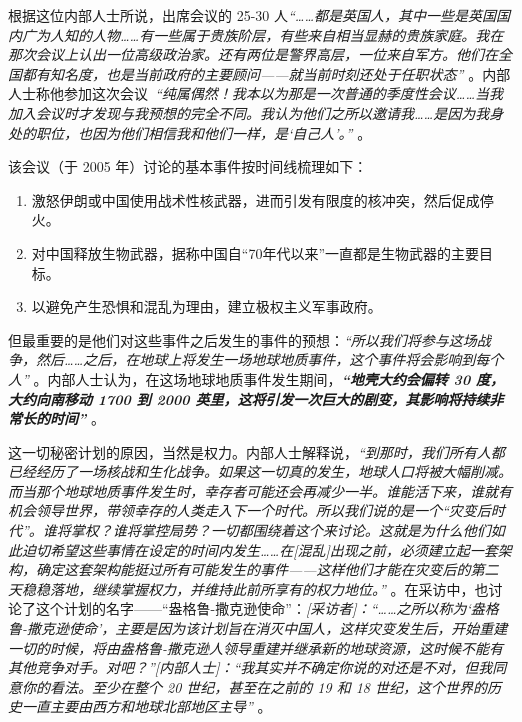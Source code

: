 \documentclass[10pt,twocolumn,letterpaper]{article}
\begin{document}
根据这位内部人士所说，出席会议的 25-30 人\textit{“……都是英国人，其中一些是英国国内广为人知的人物……有一些属于贵族阶层，有些来自相当显赫的贵族家庭。我在那次会议上认出一位高级政治家。还有两位是警界高层，一位来自军方。他们在全国都有知名度，也是当前政府的主要顾问——就当前时刻还处于任职状态”} \cite{4}。内部人士称他参加这次会议\ \textit{“纯属偶然！我本以为那是一次普通的季度性会议……当我加入会议时才发现与我预想的完全不同。我认为他们之所以邀请我……是因为我身处的职位，也因为他们相信我和他们一样，是‘自己人’。”} \cite{4}。

该会议（于 2005 年）讨论的基本事件按时间线梳理如下：

\begin{flushleft}
\begin{enumerate}
    \item 激怒伊朗或中国使用战术性核武器，进而引发有限度的核冲突，然后促成停火。
    \item 对中国释放生物武器，据称中国自“70年代以来”一直都是生物武器的主要目标。
    \item 以避免产生恐惧和混乱为理由，建立极权主义军事政府。
\end{enumerate}
\end{flushleft}

但最重要的是他们对这些事件之后发生的事件的预想：\textit{“所以我们将参与这场战争，然后……之后，在地球上将发生一场地球地质事件，这个事件将会影响到每个人”} \cite{4}。内部人士认为，在这场地球地质事件发生期间，\textit{\textbf{“地壳大约会偏转 30 度，大约向南移动 1700 到 2000 英里，这将引发一次巨大的剧变，其影响将持续非常长的时间”}} \cite{4}。

这一切秘密计划的原因，当然是权力。内部人士解释说，\textit{“到那时，我们所有人都已经经历了一场核战和生化战争。如果这一切真的发生，地球人口将被大幅削减。而当那个地球地质事件发生时，幸存者可能还会再减少一半。谁能活下来，谁就有机会领导世界，带领幸存的人类走入下一个时代。所以我们说的是一个“灾变后时代”。谁将掌权？谁将掌控局势？一切都围绕着这个来讨论。这就是为什么他们如此迫切希望这些事情在设定的时间内发生……在[混乱]出现之前，必须建立起一套架构，确定这套架构能挺过所有可能发生的事件——这样他们才能在灾变后的第二天稳稳落地，继续掌握权力，并维持此前所享有的权力地位。”} \cite{4}。在采访中，也讨论了这个计划的名字——“盎格鲁-撒克逊使命”：\textit{[采访者]：“……之所以称为‘盎格鲁-撒克逊使命’，主要是因为该计划旨在消灭中国人，这样灾变发生后，开始重建一切的时候，将由盎格鲁-撒克逊人领导重建并继承新的地球资源，这时候不能有其他竞争对手。对吧？”[内部人士]：“我其实并不确定你说的对还是不对，但我同意你的看法。至少在整个 20 世纪，甚至在之前的 19 和 18 世纪，这个世界的历史一直主要由西方和地球北部地区主导”} \cite{4}。
\end{document}

